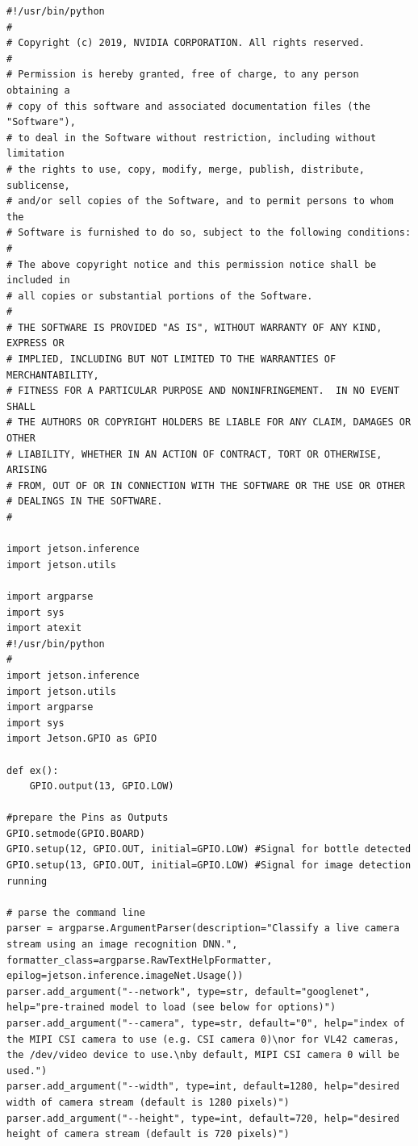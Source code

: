 \begin{lstlisting}
#!/usr/bin/python
#
# Copyright (c) 2019, NVIDIA CORPORATION. All rights reserved.
#
# Permission is hereby granted, free of charge, to any person obtaining a
# copy of this software and associated documentation files (the "Software"),
# to deal in the Software without restriction, including without limitation
# the rights to use, copy, modify, merge, publish, distribute, sublicense,
# and/or sell copies of the Software, and to permit persons to whom the
# Software is furnished to do so, subject to the following conditions:
#
# The above copyright notice and this permission notice shall be included in
# all copies or substantial portions of the Software.
#
# THE SOFTWARE IS PROVIDED "AS IS", WITHOUT WARRANTY OF ANY KIND, EXPRESS OR
# IMPLIED, INCLUDING BUT NOT LIMITED TO THE WARRANTIES OF MERCHANTABILITY,
# FITNESS FOR A PARTICULAR PURPOSE AND NONINFRINGEMENT.  IN NO EVENT SHALL
# THE AUTHORS OR COPYRIGHT HOLDERS BE LIABLE FOR ANY CLAIM, DAMAGES OR OTHER
# LIABILITY, WHETHER IN AN ACTION OF CONTRACT, TORT OR OTHERWISE, ARISING
# FROM, OUT OF OR IN CONNECTION WITH THE SOFTWARE OR THE USE OR OTHER
# DEALINGS IN THE SOFTWARE.
#

import jetson.inference
import jetson.utils

import argparse
import sys
import atexit
#!/usr/bin/python
#
import jetson.inference
import jetson.utils
import argparse
import sys
import Jetson.GPIO as GPIO

def ex():
	GPIO.output(13, GPIO.LOW)

#prepare the Pins as Outputs
GPIO.setmode(GPIO.BOARD)
GPIO.setup(12, GPIO.OUT, initial=GPIO.LOW) #Signal for bottle detected
GPIO.setup(13, GPIO.OUT, initial=GPIO.LOW) #Signal for image detection running

# parse the command line
parser = argparse.ArgumentParser(description="Classify a live camera stream using an image recognition DNN.", 
formatter_class=argparse.RawTextHelpFormatter, epilog=jetson.inference.imageNet.Usage())
parser.add_argument("--network", type=str, default="googlenet", help="pre-trained model to load (see below for options)")
parser.add_argument("--camera", type=str, default="0", help="index of the MIPI CSI camera to use (e.g. CSI camera 0)\nor for VL42 cameras, the /dev/video device to use.\nby default, MIPI CSI camera 0 will be used.")
parser.add_argument("--width", type=int, default=1280, help="desired width of camera stream (default is 1280 pixels)")
parser.add_argument("--height", type=int, default=720, help="desired height of camera stream (default is 720 pixels)")


\end{lstlisting}
